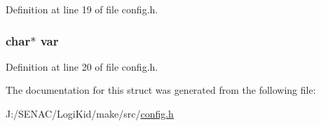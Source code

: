 Definition at line 19 of file config.\-h.

\hypertarget{struct__elemento_a7ab41949c7fcaab36a79a7418f4b6f62}{
\subsubsection[{var}]{\setlength{\rightskip}{0pt plus 5cm}char$\ast$ var}}\label{struct__elemento_a7ab41949c7fcaab36a79a7418f4b6f62}


Definition at line 20 of file config.\-h.



The documentation for this struct was generated from the following file\-:\begin{DoxyCompactItemize}
\item 
J\-:/\-S\-E\-N\-A\-C/\-Logi\-Kid/make/src/\hyperlink{config_8h}{config.\-h}\end{DoxyCompactItemize}
